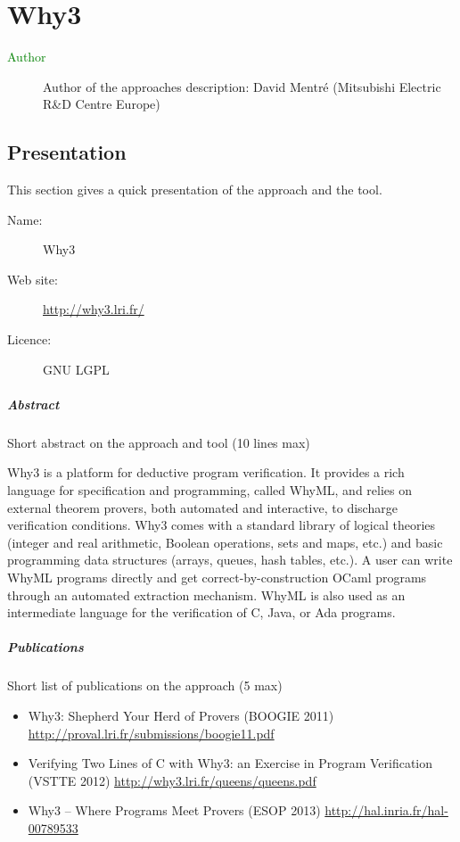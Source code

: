 \chapter{Why3}
\label{sec:why3}


\begin{description}
\item[\textcolor{green}{Author}] Author of the approaches description: David Mentré (Mitsubishi Electric R\&D Centre
Europe)
\end{description}


\section{Presentation}

This section gives a quick presentation of the approach and the tool.

\begin{description}
\item[Name:] Why3
\item[Web site: ] \url{http://why3.lri.fr/}
\item[Licence: ] GNU LGPL
\end{description}

\paragraph{Abstract} Short abstract on the approach and tool (10 lines max)

Why3 is a platform for deductive program verification. It provides a
rich language for specification and programming, called WhyML, and
relies on external theorem provers, both automated and interactive, to
discharge verification conditions. Why3 comes with a standard library
of logical theories (integer and real arithmetic, Boolean operations,
sets and maps, etc.) and basic programming data structures (arrays,
queues, hash tables, etc.). A user can write WhyML programs directly
and get correct-by-construction OCaml programs through an automated
extraction mechanism. WhyML is also used as an intermediate language
for the verification of C, Java, or Ada programs.



\paragraph{Publications} Short list of publications on the approach (5 max)

\begin{itemize}
	\item Why3: Shepherd Your Herd of Provers (BOOGIE 2011)
\url{http://proval.lri.fr/submissions/boogie11.pdf}

\item Verifying Two Lines of C with Why3: an Exercise in Program Verification (VSTTE 2012)
\url{http://why3.lri.fr/queens/queens.pdf}

\item Why3 -- Where Programs Meet Provers  (ESOP 2013)
\url{http://hal.inria.fr/hal-00789533}

\end{itemize}

